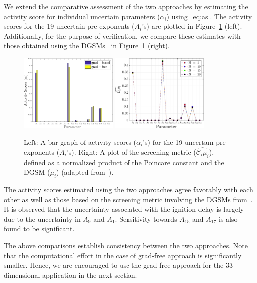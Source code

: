 We extend the comparative assessment of the two approaches by estimating the activity score for individual
uncertain parameters ($\alpha_i$) using~\eqref{eq:as}.
The activity scores for the 19 uncertain pre-exponents ($A_i$'s) are plotted in Figure~\ref{fig:comp_as} (left). 
Additionally, for the purpose of verification, we 
compare these estimates with those obtained using the DGSMs~\cite{Vohra:2018} in 
Figure~\ref{fig:comp_as} (right). 
%
\begin{figure}[htbp]
 \begin{center}
  \includegraphics[width=0.42\textwidth]{./Figures/comp_as}
  \includegraphics[width=0.42\textwidth]{./Figures/ub_conv_kinetics_rich}
\caption{Left: A bar-graph of activity scores ($\alpha_i$'s) for the 19 uncertain pre-exponents ($A_i$'s).
Right: A plot of the screening metric ($\widehat{\mathcal{C}_i\mu_i}$), defined as a normalized product of the
Poincare constant and the DGSM ($\mu_i$) (adapted from~\cite{Vohra:2018}).}
\label{fig:comp_as}
\end{center}
\end{figure}
%
The activity scores estimated using the two approaches agree favorably with each other as well as those
based on the screening metric involving the DGSMs from~\cite{Vohra:2018}. It is observed that the uncertainty
associated with the ignition delay is largely due to the uncertainty in $A_9$ and $A_1$. Sensitivity towards
$A_{15}$ and $A_{17}$ is also found to be significant. 

The above comparisons establish consistency between the two approaches. Note that the computational
effort in the case of grad-free approach is significantly smaller. Hence, we are encouraged to use the
grad-free approach for the 33-dimensional application in the next section. 


